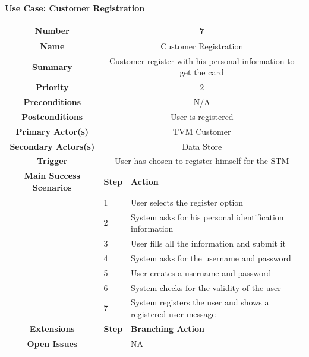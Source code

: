 \documentclass[a4paper,12pt]{report}
\begin{document}


\vspace{0.5cm}
\textbf{\large Use Case: Customer Registration}
\\

\begin{tabular}{ | c | p{2cm} | p{7cm} |}
	
	\hline
	\textbf{Number} & \multicolumn{2}{c|}{7}  \\
	\hline
	\textbf{Name} & \multicolumn{2}{c|}{Customer Registration}  \\
	\hline
	\textbf{Summary} & \multicolumn{2}{c|}{Customer register with his personal information to get the card}  \\
	\hline
	\textbf{Priority} & \multicolumn{2}{c|}{2}  \\
	\hline
	\textbf{Preconditions} & \multicolumn{2}{c|}{N/A}  \\
	\hline
	\textbf{Postconditions} & \multicolumn{2}{c|}{User is registered}  \\
	\hline
	\textbf{Primary Actor(s)} & \multicolumn{2}{c|}{TVM Customer}  \\
	\hline
	\textbf{Secondary Actors(s)} & \multicolumn{2}{c|}{Data Store}  \\
	\hline
	\textbf{Trigger} & \multicolumn{2}{c|}{User has chosen to register himself for the STM} \\
	\hline
	\textbf{Main Success Scenarios} & \textbf{Step} & \textbf{Action} \\
	\hline
	& 1 & User selects the register option \\ 
	\hline
	&  2  & System asks for his personal identification information \\
	\hline
	&  3  & User fills all the information and submit it \\
	\hline
	&  4  & System asks for the username and password \\
	\hline
	&  5  & User creates a username and password \\
	\hline
	&  6  & System checks for the validity of the user \\
	\hline
	&  7  & System registers the user and shows a registered user message \\
	\hline

	\textbf{Extensions} & \textbf{Step} & \textbf{Branching Action} \\
	\hline
	\textbf{Open Issues} &    & NA \\
	\hline

\end{tabular}
\end{document}
